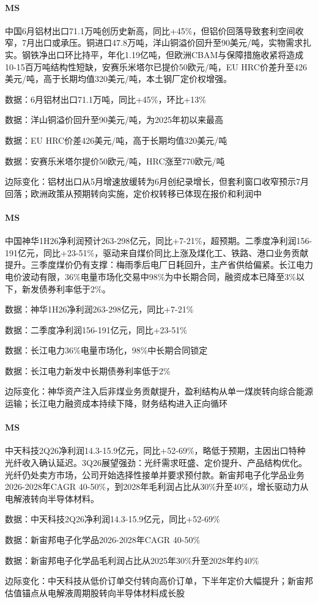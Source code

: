 \documentclass[11pt]{ctexart}
\begin{document}
\paragraph{MS} 中国6月铝材出口71.1万吨创历史新高，同比+45\%，但铝价回落导致套利空间收窄，7月出口或承压。铜进口47.8万吨，洋山铜溢价回升至90美元/吨，实物需求扎实。钢铁净出口环比持平，年化1.19亿吨，但欧洲CBAM与保障措施收紧将造成10-15百万吨结构性短缺，安赛乐米塔尔已提价50欧元/吨，EU HRC价差升至426美元/吨，高于长期均值320美元/吨，本土钢厂定价权增强。
{\small\color{refgray}数据：6月铝材出口71.1万吨，同比+45\%，环比+13\%\par}
{\small\color{refgray}数据：洋山铜溢价回升至90美元/吨，为2025年初以来最高\par}
{\small\color{refgray}数据：EU HRC价差426美元/吨，高于长期均值320美元/吨\par}
{\small\color{refgray}数据：安赛乐米塔尔提价50欧元/吨，HRC涨至770欧元/吨\par}
{\small\color{refgray}边际变化：铝材出口从5月增速放缓转为6月创纪录增长，但套利窗口收窄预示7月回落；欧洲政策从预期转向实施，定价权转移已体现在报价和利润中\par}
\paragraph{MS} 中国神华1H26净利润预计263-298亿元，同比+7-21\%，超预期。二季度净利润156-191亿元，同比+23-51\%，驱动来自煤价同比上涨及煤化工、铁路、港口业务贡献提升。三季度煤价仍有支撑：梅雨季后电厂日耗回升，主产省供给偏紧。长江电力电价波动有限，36\%电量市场化交易中98\%为中长期合同，融资成本已降至3\%以下，新发债券利率低于2\%。
{\small\color{refgray}数据：神华1H26净利润263-298亿元，同比+7-21\%\par}
{\small\color{refgray}数据：二季度净利润156-191亿元，同比+23-51\%\par}
{\small\color{refgray}数据：长江电力36\%电量市场化，98\%中长期合同锁定\par}
{\small\color{refgray}数据：长江电力新发中长期债券利率低于2\%\par}
{\small\color{refgray}边际变化：神华资产注入后非煤业务贡献提升，盈利结构从单一煤炭转向综合能源运输；长江电力融资成本持续下降，财务结构进入正向循环\par}
\paragraph{MS} 中天科技2Q26净利润14.3-15.9亿元，同比+52-69\%，略低于预期，主因出口特种光纤收入确认延迟。3Q26展望强劲：光纤需求旺盛、定价提升、产品结构优化。光纤仍处卖方市场，公司开始选择性接单并要求预付款。新宙邦电子化学品业务2026-2028年CAGR 40-50\%，到2028年毛利润占比从30\%升至40\%，增长驱动力从电解液转向半导体材料。
{\small\color{refgray}数据：中天科技2Q26净利润14.3-15.9亿元，同比+52-69\%\par}
{\small\color{refgray}数据：新宙邦电子化学品2026-2028年CAGR 40-50\%\par}
{\small\color{refgray}数据：新宙邦电子化学品毛利润占比从2025年30\%升至2028年约40\%\par}
{\small\color{refgray}边际变化：中天科技从低价订单交付转向高价订单，下半年定价大幅提升；新宙邦估值锚点从电解液周期股转向半导体材料成长股\par}
\end{document}
